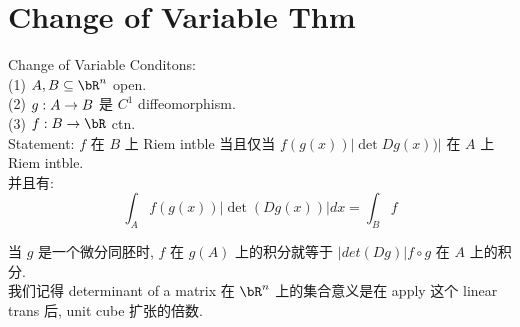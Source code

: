 \chapter{Change of Variable Thm}
\begin{theorem}{Change of Variable}
Conditons:\\
(1) $A,B \sub \bR^n$ open.\\
(2) $g:A \rightarrow B$ 是 $C^1$ diffeomorphism.\\
(3) $f:B \rar \bR$ ctn.\\

Statement:
$f$ 在 $B$ 上 Riem intble 当且仅当 $f(g(x))  |\det Dg(x)) |$ 在 $A$ 上 Riem intble.\\
并且有:
$$
\int_A f(g(x)) |\det (Dg(x))| dx = \int_B f
$$
    
\end{theorem}
\begin{remark}
    当 $g$ 是一个微分同胚时, $f$ 在 $g(A)$ 上的积分就等于 $|det(Dg)| f\circ g $ 在 $A$ 上的积分.\\
    我们记得 determinant of a matrix 在 $\bR^n$ 上的集合意义是在 apply 这个 linear trans 后, unit cube 扩张的倍数.\\
\end{remark}




